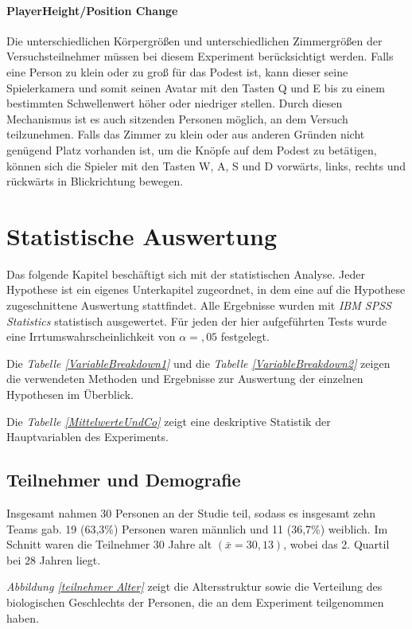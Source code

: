 \documentclass[a4paper,11pt]{article}%
\renewcommand{\\}{\vspace*{0.5\baselineskip} \newline}
\begin{document}
{{\paragraph{PlayerHeight/Position Change}
Die unterschiedlichen Körpergrößen und unterschiedlichen Zimmergrößen der Versuchsteilnehmer müssen bei diesem Experiment berücksichtigt werden. Falls eine Person zu klein oder zu groß für das Podest ist, kann dieser seine Spielerkamera und somit seinen Avatar mit den Tasten Q und E bis zu einem bestimmten Schwellenwert höher oder niedriger stellen. Durch diesen Mechanismus ist es auch sitzenden Personen möglich, an dem Versuch teilzunehmen. Falls das Zimmer zu klein oder aus anderen Gründen nicht genügend Platz vorhanden ist, um die Knöpfe auf dem Podest zu betätigen, können sich die Spieler mit den Tasten W, A, S und D vorwärts, links, rechts und rückwärts in Blickrichtung bewegen.

\newpage	
\section{Statistische Auswertung}
Das folgende Kapitel beschäftigt sich mit der statistischen Analyse. Jeder Hypothese ist ein eigenes Unterkapitel zugeordnet, in dem eine auf die Hypothese zugeschnittene Auswertung stattfindet. Alle Ergebnisse wurden mit \textit{IBM SPSS Statistics} statistisch ausgewertet. 
Für jeden der hier aufgeführten Tests wurde eine Irrtumswahrscheinlichkeit von  $\alpha =,05$ festgelegt.

Die \textit{Tabelle \ref{VariableBreakdown1}} und die \textit{Tabelle \ref{VariableBreakdown2}} zeigen die verwendeten Methoden und Ergebnisse zur Auswertung der einzelnen Hypothesen im Überblick.

Die \textit{Tabelle \ref{MittelwerteUndCo}} zeigt eine deskriptive Statistik der Hauptvariablen des Experiments.
	\subsection{Teilnehmer und Demografie}
Insgesamt nahmen 30 Personen an der Studie teil, sodass es insgesamt zehn Teams gab. 19 (63,3\%) Personen waren männlich und 11 (36,7\%) weiblich. Im Schnitt waren die Teilnehmer 30 Jahre alt $(\bar{x} = 30,13)$, wobei das 2. Quartil bei $28$ Jahren liegt.

{\textit{Abbildung \ref{teilnehmer Alter}} zeigt die Altersstruktur sowie die Verteilung des biologischen Geschlechts der Personen, die an dem Experiment teilgenommen haben. 

}}}
\end{document}
